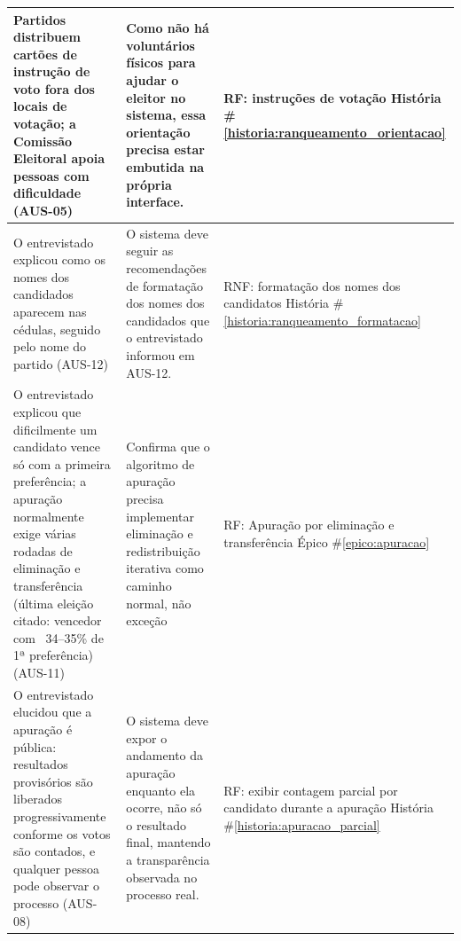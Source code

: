 \documentclass[12pt,a4paper]{article}
\newcounter{epico}
\newcounter{historia}
\begin{document}
\begin{longtable}{|p{7cm}|p{4.5cm}|p{4.5cm}|}
    \hline
    
    Partidos distribuem cartões de instrução de voto fora dos locais de votação; a Comissão Eleitoral apoia pessoas com dificuldade (AUS-05)
    & Como não há voluntários físicos para ajudar o eleitor no sistema, essa orientação precisa estar embutida na própria interface.
    & RF: instruções de votação
    \newline \newline História \#\ref{historia:ranqueamento_orientacao} \\

    \hline
    
    O entrevistado explicou como os nomes dos candidados aparecem nas cédulas, seguido pelo nome do partido (AUS-12)
    & O sistema deve seguir as recomendações de formatação dos nomes dos candidados que o entrevistado informou em AUS-12.
    & RNF: formatação dos nomes dos candidatos
    \newline \newline História \#\ref{historia:ranqueamento_formatacao} \\

    \hline
    
    O entrevistado explicou que dificilmente um candidato vence só com a primeira preferência; a apuração normalmente exige várias rodadas de eliminação e transferência (última eleição citado: vencedor com ~34–35\% de 1ª preferência) (AUS-11)
    & Confirma que o algoritmo de apuração precisa implementar eliminação e redistribuição iterativa como caminho normal, não exceção
    & RF: Apuração por eliminação e transferência
    \newline \newline Épico \#\ref{epico:apuracao} \\
    
    \hline
    
    O entrevistado elucidou que a apuração é pública: resultados provisórios são liberados progressivamente conforme os votos são contados, e qualquer pessoa pode observar o processo (AUS-08)
    & O sistema deve expor o andamento da apuração enquanto ela ocorre, não só o resultado final, mantendo a transparência observada no processo real.
    & RF: exibir contagem parcial por candidato durante a apuração
    \newline \newline História \#\ref{historia:apuracao_parcial} \\
    
    \hline


\end{longtable}
\end{document}
